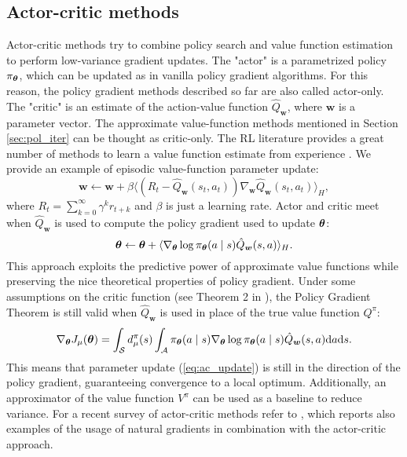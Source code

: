 \subsection{Actor-critic methods}
Actor-critic methods try to combine policy search and value function estimation to perform low-variance gradient updates. The "actor" is a parametrized policy $\pi_{\boldsymbol{\theta}}$, which can be updated as in vanilla policy gradient algorithms. For this reason, the policy gradient methods described so far are also called actor-only. The "critic" is an estimate of the action-value function $\hat{Q}_{\boldsymbol{w}}$, where $\boldsymbol{w}$ is a parameter vector. The approximate value-function methods mentioned in Section \ref{sec:pol_iter} can be thought as critic-only. The \ac{RL} literature provides a great number of methods to learn a value function estimate from experience \cite{Sutton:1998:IRL:551283}. We provide an example of episodic value-function parameter update:
\[
	\boldsymbol{w} \gets \boldsymbol{w} + \beta\langle
		(R_t-\hat{Q}_{\boldsymbol{w}}(s_t,a_t))
		\nabla_{\boldsymbol{w}}\hat{Q}_{\boldsymbol{w}}(s_t,a_t)\rangle_H,
\] 
where $R_t = \sum\limits_{k=0}^{\infty}\gamma^kr_{t+k}$ and $\beta$ is just a learning rate.
Actor and critic meet when $\hat{Q}_{\boldsymbol{w}}$ is used to compute the policy gradient used to update $\boldsymbol{\theta}$:
\begin{equation}\label{eq:ac_update} 
	\boldsymbol{\theta} \gets \boldsymbol{\theta} + \langle\nabla_{\boldsymbol{\theta}}\log\pi_{\boldsymbol{\theta}}(a \mid s) \hat{Q}_{\boldsymbol{w}}(s,a)\rangle_H.
\end{equation}
This approach exploits the predictive power of approximate value functions while preserving the nice theoretical properties of policy gradient. Under some assumptions on the critic function (see Theorem 2 in \cite{Sutton1999a}), the Policy Gradient Theorem is still valid when $\hat{Q}_{\boldsymbol{w}}$ is used in place of the true value function $Q^\pi$:
\[
	\nabla_{\boldsymbol{\theta}}J_\mu(\boldsymbol{\theta}) = \int_{\mathcal{S}}d_{\mu}^{\pi}(s)
		\int_{\mathcal{A}}\pi_{\boldsymbol{\theta}}(a \mid s)\nabla_{\boldsymbol{\theta}}\log\pi_{\boldsymbol{\theta}}(a \mid s)
		\hat{Q}_{\boldsymbol{w}}(s,a)\mathrm{d}a\mathrm{d}s.
\]
This means that parameter update (\ref{eq:ac_update}) is still in the direction of the policy gradient, guaranteeing convergence to a local optimum.
Additionally, an approximator of the value function $V^\pi$ can be used as a baseline to reduce variance.
For a recent survey of actor-critic methods refer to \cite{grondman2012survey}, which reports also examples of the usage of natural gradients in combination with the actor-critic approach.

